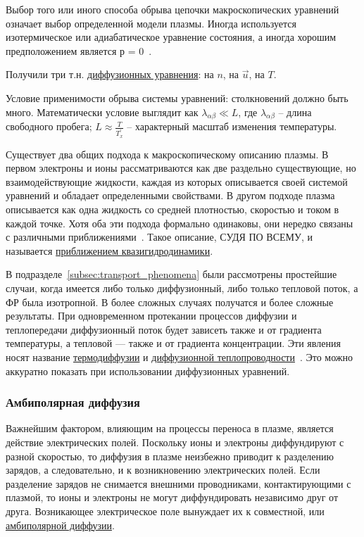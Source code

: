 \documentclass[10pt, a4paper]{article}
\begin{document}
Выбор того или иного способа обрыва цепочки макроскопических уравнений означает выбор определенной модели плазмы. Иногда используется изотермическое или адиабатическое уравнение состояния, а иногда хорошим предположением является р = 0~\cite{kroll}.

Получили три т.н. \uline{диффузионных уравнения}: на $n$, на $\vec{u}$, на $T$.

Условие применимости обрыва системы уравнений: столкновений должно быть много. Математически условие выглядит как $\lambda_{\alpha\beta}\ll L$, где $\lambda_{\alpha\beta}$ -- длина свободного пробега; $L \approx \frac{T}{T^{'}_x}$ -- характерный масштаб изменения температуры.

Существует два общих подхода к макроскопическому описанию плазмы. В первом электроны и ионы рассматриваются как две раздельно существующие, но взаимодействующие жидкости, каждая из которых описывается своей системой
уравнений и обладает определенными свойствами. В другом подходе плазма
описывается как одна жидкость со средней плотностью, скоростью и током
в каждой точке. Хотя оба эти подхода формально одинаковы, они нередко
связаны с различными приближениями~\cite{kroll}. Такое описание, СУДЯ ПО ВСЕМУ, и называется \uline{приближением квазигидродинамики}.

В подразделе~\ref{subsec:transport_phenomena} были рассмотрены простейшие случаи, когда имеется
либо только диффузионный, либо только тепловой поток, а
ФР была изотропной. В более сложных
случаях получатся и более сложные результаты. При одновременном протекании процессов диффузии и теплопередачи
диффузионный поток будет зависеть также и от градиента
температуры, а тепловой — также и от градиента концентрации. Эти явления носят название \uline{термодиффузии} и \uline{диффузионной теплопроводности}~\cite{frank}. Это можно аккуратно показать при использовании диффузионных уравнений.

\subsubsection{Амбиполярная диффузия}

Важнейшим фактором, влияющим на процессы переноса в плазме, является действие электрических полей. Поскольку ионы и электроны диффундируют с разной
скоростью, то диффузия в плазме неизбежно приводит к разделению зарядов, а следовательно, и к возникновению электрических полей. Если разделение зарядов не снимается
внешними проводниками, контактирующими с плазмой, то
ионы и электроны не могут диффундировать независимо
друг от друга. Возникающее электрическое поле вынуждает
их к совместной, или \uline{амбиполярной диффузии}.
\end{document}
